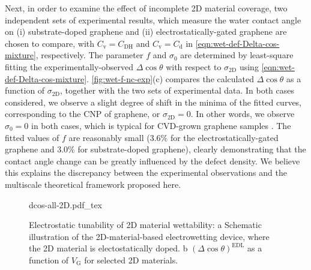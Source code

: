 Next, in order to examine the effect of incomplete 2D material
coverage, two independent sets of experimental results, which measure
the water contact angle on (i) substrate-doped graphene
\cite{Ashraf_2016_doping} and (ii) electrostatically-gated
graphene \cite{Hong_2016_mechanism} are chosen to compare, with
\(C_{\mathrm{v}} = C_{\mathrm{DH}}\) and \(C_{\mathrm{v}} =
C_{\mathrm{d}}\) in \autoref{eqn:wet-def-Delta-cos-mixture}, respectively. The
parameter \(f\) and \(\sigma_{0}\) are determined by least-square fitting
the experimentally-observed \(\Delta \cos \theta\) with respect to
\(\sigma_{\mathrm{2D}}\) using \autoref{eqn:wet-def-Delta-cos-mixture}. 
\autoref{fig:wet-f-nc-exp}(c) compares the calculated \(\Delta \cos \theta\) as a
function of \(\sigma_{\mathrm{2D}}\), together with the two sets of
experimental data. In both cases considered, we observe a slight
degree of shift in the minima of the fitted curves, corresponding to
the CNP of graphene, or \(\sigma_{\mathrm{2D}} = 0\). In other words, we
observe \(\sigma_{0} = 0\) in both cases, which is typical for
CVD-grown graphene samples
\cite{Shih_2015_PartiallyScreened,goniszewski_correlation_2016}.  The
fitted values of \(f\) are reasonably small (3.6\% for the
electrostatically-gated graphene and 3.0\% for substrate-doped
graphene), clearly demonstrating that the contact angle change can be
greatly influenced by the defect density. We believe this explains the
discrepancy between the experimental observations and the multiscale
theoretical framework proposed here.

\begin{figure}[!htbp]
  \centering
  {dcos-all-2D.pdf_tex}
\caption{\label{fig:wet-dcos-all-2D} Electrostatic tunability of 2D
  material wettability: a Schematic illustration of the
  2D-material-based electrowetting device, where the 2D material is
  electostatically doped. b \((\Delta\cos\theta)^{\mathrm{EDL}}\) as
  a function of \(V_{\mathrm{G}}\) for selected 2D materials.}
\end{figure}


